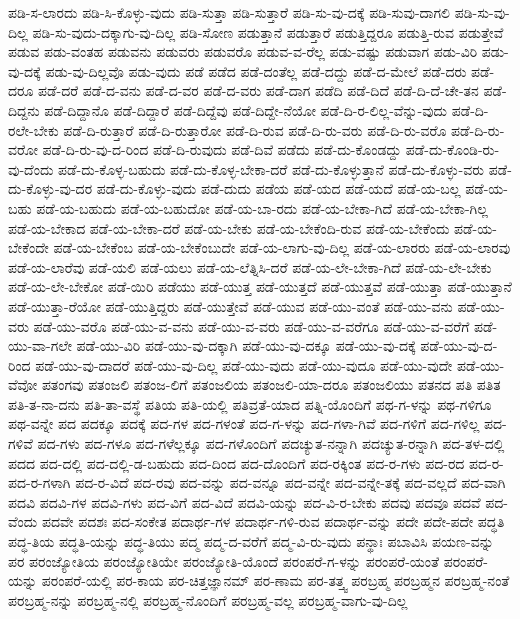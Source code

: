{ಪಡಿ-ಸ-ಲಾರದು
ಪಡಿ-ಸಿ-ಕೊಳ್ಳು-ವುದು
ಪಡಿ-ಸುತ್ತಾ
ಪಡಿ-ಸುತ್ತಾರೆ
ಪಡಿ-ಸು-ವು-ದಕ್ಕೆ
ಪಡಿ-ಸುವು-ದಾಗಲಿ
ಪಡಿ-ಸು-ವು-ದಿಲ್ಲ
ಪಡಿ-ಸು-ವುದು-ದಕ್ಕಾಗು-ವು-ದಿಲ್ಲ
ಪಡಿ-ಸೋಣ
ಪಡುತ್ತಾನೆ
ಪಡುತ್ತಾರೆ
ಪಡುತ್ತಿದ್ದರೂ
ಪಡುತ್ತಿ-ರುವ
ಪಡುತ್ತೇವೆ
ಪಡುವ
ಪಡು-ವಂತಹ
ಪಡುವನು
ಪಡುವರು
ಪಡುವರೊ
ಪಡುವ-ವ-ರೆಲ್ಲ
ಪಡು-ವಷ್ಟು
ಪಡುವಾಗ
ಪಡು-ವಿರಿ
ಪಡು-ವು-ದಕ್ಕೆ
ಪಡು-ವು-ದಿಲ್ಲವೊ
ಪಡು-ವುದು
ಪಡೆ
ಪಡೆದ
ಪಡೆ-ದಂತೆಲ್ಲ
ಪಡೆ-ದದ್ದು
ಪಡೆ-ದ-ಮೇಲೆ
ಪಡೆ-ದರು
ಪಡೆ-ದರೂ
ಪಡೆ-ದರೆ
ಪಡೆ-ದ-ವನು
ಪಡೆ-ದ-ವರ
ಪಡೆ-ದ-ವರು
ಪಡೆ-ದಾಗ
ಪಡೆದಿ
ಪಡೆ-ದಿದೆ
ಪಡೆ-ದಿ-ದೆ-ಚೇ-ತನ
ಪಡೆ-ದಿದ್ದನು
ಪಡೆ-ದಿದ್ದಾನೊ
ಪಡೆ-ದಿದ್ದಾರೆ
ಪಡೆ-ದಿದ್ದೆವು
ಪಡೆ-ದಿದ್ದೇ-ನೆಯೋ
ಪಡೆ-ದಿ-ರ-ಲಿಲ್ಲ-ವೆನ್ನು-ವುದು
ಪಡೆ-ದಿ-ರಲೇ-ಬೇಕು
ಪಡೆ-ದಿ-ರುತ್ತಾರೆ
ಪಡೆ-ದಿ-ರುತ್ತಾರೋ
ಪಡೆ-ದಿ-ರುವ
ಪಡೆ-ದಿ-ರು-ವರು
ಪಡೆ-ದಿ-ರು-ವರೊ
ಪಡೆ-ದಿ-ರು-ವರೋ
ಪಡೆ-ದಿ-ರು-ವು-ದ-ರಿಂದ
ಪಡೆ-ದಿ-ರುವುದು
ಪಡೆ-ದಿವೆ
ಪಡೆದು
ಪಡೆ-ದು-ಕೊಂಡದ್ದು
ಪಡೆ-ದು-ಕೊಂಡಿ-ರು-ವು-ದೆಂದು
ಪಡೆ-ದು-ಕೊಳ್ಳ-ಬಹುದು
ಪಡೆ-ದು-ಕೊಳ್ಳ-ಬೇಕಾ-ದರೆ
ಪಡೆ-ದು-ಕೊಳ್ಳುತ್ತಾನೆ
ಪಡೆ-ದು-ಕೊಳ್ಳು-ವರು
ಪಡೆ-ದು-ಕೊಳ್ಳು-ವು-ದರ
ಪಡೆ-ದು-ಕೊಳ್ಳು-ವುದು
ಪಡೆ-ದುದು
ಪಡೆಯ
ಪಡೆ-ಯದ
ಪಡೆ-ಯದೆ
ಪಡೆ-ಯ-ಬಲ್ಲ
ಪಡೆ-ಯ-ಬಹು
ಪಡೆ-ಯ-ಬಹುದು
ಪಡೆ-ಯ-ಬಹುದೋ
ಪಡೆ-ಯ-ಬಾ-ರದು
ಪಡೆ-ಯ-ಬೇಕಾ-ಗಿದೆ
ಪಡೆ-ಯ-ಬೇಕಾ-ಗಿಲ್ಲ
ಪಡೆ-ಯ-ಬೇಕಾದ
ಪಡೆ-ಯ-ಬೇಕಾ-ದರೆ
ಪಡೆ-ಯ-ಬೇಕು
ಪಡೆ-ಯ-ಬೇಕೆಂದಿ-ರುವ
ಪಡೆ-ಯ-ಬೇಕೆಂದು
ಪಡೆ-ಯ-ಬೇಕೆಂದೇ
ಪಡೆ-ಯ-ಬೇಕೆಂಬ
ಪಡೆ-ಯ-ಬೇಕೆಂಬುದೇ
ಪಡೆ-ಯ-ಲಾಗು-ವು-ದಿಲ್ಲ
ಪಡೆ-ಯ-ಲಾರರು
ಪಡೆ-ಯ-ಲಾರವು
ಪಡೆ-ಯ-ಲಾರೆವು
ಪಡೆ-ಯಲಿ
ಪಡೆ-ಯಲು
ಪಡೆ-ಯ-ಲೆತ್ನಿಸಿ-ದರೆ
ಪಡೆ-ಯ-ಲೇ-ಬೇಕಾ-ಗಿದೆ
ಪಡೆ-ಯ-ಲೇ-ಬೇಕು
ಪಡೆ-ಯ-ಲೇ-ಬೇಕೋ
ಪಡೆ-ಯಿರಿ
ಪಡೆಯು
ಪಡೆ-ಯುತ್ತ
ಪಡೆ-ಯುತ್ತದೆ
ಪಡೆ-ಯುತ್ತವೆ
ಪಡೆ-ಯುತ್ತಾ
ಪಡೆ-ಯುತ್ತಾನೆ
ಪಡೆ-ಯುತ್ತಾ-ರೆಯೋ
ಪಡೆ-ಯುತ್ತಿದ್ದರು
ಪಡೆ-ಯುತ್ತೇವೆ
ಪಡೆ-ಯುವ
ಪಡೆ-ಯು-ವಂತೆ
ಪಡೆ-ಯು-ವನು
ಪಡೆ-ಯು-ವರು
ಪಡೆ-ಯು-ವರೊ
ಪಡೆ-ಯು-ವ-ವನು
ಪಡೆ-ಯು-ವ-ವರು
ಪಡೆ-ಯು-ವ-ವರೆಗೂ
ಪಡೆ-ಯು-ವ-ವರೆಗೆ
ಪಡೆ-ಯು-ವಾ-ಗಲೇ
ಪಡೆ-ಯು-ವಿರಿ
ಪಡೆ-ಯು-ವು-ದಕ್ಕಾಗಿ
ಪಡೆ-ಯು-ವು-ದಕ್ಕೂ
ಪಡೆ-ಯು-ವು-ದಕ್ಕೆ
ಪಡೆ-ಯು-ವು-ದ-ರಿಂದ
ಪಡೆ-ಯು-ವು-ದಾದರೆ
ಪಡೆ-ಯು-ವು-ದಿಲ್ಲ
ಪಡೆ-ಯು-ವುದು
ಪಡೆ-ಯು-ವುದೂ
ಪಡೆ-ಯು-ವುದೇ
ಪಡೆ-ಯು-ವೆವೋ
ಪತಂಗವು
ಪತಂಜಲಿ
ಪತಂಜ-ಲಿಗೆ
ಪತಂಜಲಿಯ
ಪತಂಜಲಿ-ಯಾ-ದರೂ
ಪತಂಜಲಿಯು
ಪತನದ
ಪತಿ
ಪತಿತ
ಪತಿ-ತ-ನಾ-ದನು
ಪತಿ-ತಾ-ವಸ್ಥೆ
ಪತಿಯ
ಪತಿ-ಯಲ್ಲಿ
ಪತಿವ್ರತೆ-ಯಾದ
ಪತ್ನಿ-ಯೊಂದಿಗೆ
ಪಥ-ಗ-ಳನ್ನು
ಪಥ-ಗಳಿಗೂ
ಪಥ-ವನ್ನೇ
ಪದ
ಪದಕ್ಕೂ
ಪದಕ್ಕೆ
ಪದ-ಗಳ
ಪದ-ಗಳಂತೆ
ಪದ-ಗ-ಳನ್ನು
ಪದ-ಗಳಾ-ಗಿವೆ
ಪದ-ಗಳಿಗೆ
ಪದ-ಗಳಿಲ್ಲ
ಪದ-ಗಳಿವೆ
ಪದ-ಗಳು
ಪದ-ಗಳೂ
ಪದ-ಗಳೆಲ್ಲಕ್ಕೂ
ಪದ-ಗಳೊಂದಿಗೆ
ಪದಚ್ಯುತ-ನನ್ನಾಗಿ
ಪದಚ್ಯುತ-ರನ್ನಾಗಿ
ಪದ-ತಳ-ದಲ್ಲಿ
ಪದದ
ಪದ-ದಲ್ಲಿ
ಪದ-ದಲ್ಲಿ-ಡ-ಬಹುದು
ಪದ-ದಿಂದ
ಪದ-ದೊಂದಿಗೆ
ಪದ-ರಕ್ಕಿಂತ
ಪದ-ರ-ಗಳು
ಪದ-ರದ
ಪದ-ರ-ಪದ-ರ-ಗಳಾಗಿ
ಪದ-ರ-ವಿದೆ
ಪದ-ರವು
ಪದ-ವನ್ನು
ಪದ-ವನ್ನೂ
ಪದ-ವನ್ನೇ
ಪದ-ವನ್ನೇ-ತಕ್ಕೆ
ಪದ-ವಲ್ಲದೆ
ಪದ-ವಾಗಿ
ಪದವಿ
ಪದವಿ-ಗಳ
ಪದವಿ-ಗಳು
ಪದ-ವಿಗೆ
ಪದ-ವಿದೆ
ಪದವಿ-ಯನ್ನು
ಪದ-ವಿ-ರ-ಬೇಕು
ಪದವು
ಪದವೂ
ಪದವೆ
ಪದ-ವೆಂದು
ಪದವೇ
ಪದಶಃ
ಪದ-ಸಂಕೇತ
ಪದಾರ್ಥ-ಗಳ
ಪದಾರ್ಥ-ಗಳಿ-ರುವ
ಪದಾರ್ಥ-ವನ್ನು
ಪದೇ
ಪದೇ-ಪದೇ
ಪದ್ಧತಿ
ಪದ್ಧ-ತಿಯ
ಪದ್ಧತಿ-ಯನ್ನು
ಪದ್ಧ-ತಿಯು
ಪದ್ಮ
ಪದ್ಮ-ದ-ವರೆಗೆ
ಪದ್ಮ-ವಿ-ರು-ವುದು
ಪನ್ಥಾಃ
ಪಬಾವಿಸಿ
ಪಯಣ-ವನ್ನು
ಪರ
ಪರಂಜ್ಯೋತಿಯ
ಪರಂಜ್ಯೋತಿಯೇ
ಪರಂಜ್ಯೋತಿ-ಯೊಂದೆ
ಪರಂಪರೆ-ಗ-ಳನ್ನು
ಪರಂಪರೆ-ಯಂತೆ
ಪರಂಪರೆ-ಯನ್ನು
ಪರಂಪರೆ-ಯಲ್ಲಿ
ಪರ-ಕಾಯ
ಪರ-ಚಿತ್ತಜ್ಞಾನಮ್
ಪರ-ಣಾಮ
ಪರ-ತತ್ತ್ವ
ಪರಬ್ರಹ್ಮ
ಪರಬ್ರಹ್ಮನ
ಪರಬ್ರಹ್ಮ-ನಂತೆ
ಪರಬ್ರಹ್ಮ-ನನ್ನು
ಪರಬ್ರಹ್ಮ-ನಲ್ಲಿ
ಪರಬ್ರಹ್ಮ-ನೊಂದಿಗೆ
ಪರಬ್ರಹ್ಮ-ವಲ್ಲ
ಪರಬ್ರಹ್ಮ-ವಾಗು-ವು-ದಿಲ್ಲ
}

